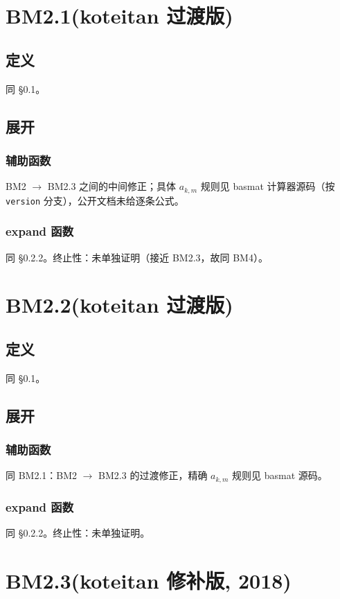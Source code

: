 \documentclass[UTF8]{ctexart}
\begin{document}
\section{BM2.1(koteitan 过渡版)}
\subsection{定义}
同 \S 0.1。

\subsection{展开}
\subsubsection{辅助函数}
BM2 $\to$ BM2.3 之间的中间修正；具体 $a_{k,m}$ 规则见 basmat 计算器源码（按 \texttt{version} 分支），公开文档未给逐条公式。

\subsubsection{expand 函数}
同 \S 0.2.2。终止性：未单独证明（接近 BM2.3，故同 BM4）。

\section{BM2.2(koteitan 过渡版)}
\subsection{定义}
同 \S 0.1。

\subsection{展开}
\subsubsection{辅助函数}
同 BM2.1：BM2 $\to$ BM2.3 的过渡修正，精确 $a_{k,m}$ 规则见 basmat 源码。

\subsubsection{expand 函数}
同 \S 0.2.2。终止性：未单独证明。

\section{BM2.3(koteitan 修补版, 2018)}
\end{document}
